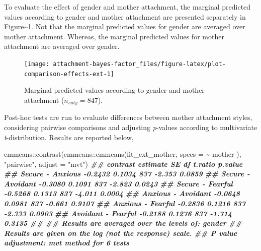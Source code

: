 \documentclass[
]{book}
\newenvironment{Shaded}{\begin{snugshade}}{\end{snugshade}}
\newcommand{\AttributeTok}[1]{\textcolor[rgb]{0.77,0.63,0.00}{#1}}
\newcommand{\DocumentationTok}[1]{\textcolor[rgb]{0.56,0.35,0.01}{\textbf{\textit{#1}}}}
\newcommand{\FunctionTok}[1]{\textcolor[rgb]{0.00,0.00,0.00}{#1}}
\newcommand{\NormalTok}[1]{#1}
\newcommand{\SpecialCharTok}[1]{\textcolor[rgb]{0.00,0.00,0.00}{#1}}
\newcommand{\StringTok}[1]{\textcolor[rgb]{0.31,0.60,0.02}{#1}}
\begin{document}
To evaluate the effect of gender and mother attachment, the marginal predicted values according to gender and mother attachment are presented separately in Figure\textasciitilde\ref{fig:plot-comparison-effects-ext}. Not that the marginal predicted values for gender are averaged over mother attachment. Whereas, the marginal predicted values for mother attachment are averaged over gender.

\begin{figure}

{\centering \texttt{[image: attachment-bayes-factor\_files/figure-latex/plot-comparison-effects-ext-1]} 

}

\caption{Marginal predicted values according to gender and mother attachment ($n_{subj} = 847$).}\label{fig:plot-comparison-effects-ext}
\end{figure}

Post-hoc tests are run to evaluate differences between mother attachment styles, considering pairwise comparisons and adjusting \emph{p}-values according to multivariate \emph{t}-distribution. Results are reported below,

\begin{Shaded}
\begin{Highlighting}[]
\NormalTok{emmeans}\SpecialCharTok{::}\FunctionTok{contrast}\NormalTok{(emmeans}\SpecialCharTok{::}\FunctionTok{emmeans}\NormalTok{(fit\_ext\_mother, }\AttributeTok{specs =} \SpecialCharTok{\textasciitilde{}}\NormalTok{ mother ),}
                  \StringTok{"pairwise"}\NormalTok{, }\AttributeTok{adjust =} \StringTok{"mvt"}\NormalTok{)}
\DocumentationTok{\#\#  contrast           estimate     SE  df t.ratio p.value}
\DocumentationTok{\#\#  Secure {-} Anxious    {-}0.2432 0.1034 837  {-}2.353  0.0859}
\DocumentationTok{\#\#  Secure {-} Avoidant   {-}0.3080 0.1091 837  {-}2.823  0.0243}
\DocumentationTok{\#\#  Secure {-} Fearful    {-}0.5268 0.1313 837  {-}4.011  0.0004}
\DocumentationTok{\#\#  Anxious {-} Avoidant  {-}0.0648 0.0981 837  {-}0.661  0.9107}
\DocumentationTok{\#\#  Anxious {-} Fearful   {-}0.2836 0.1216 837  {-}2.333  0.0903}
\DocumentationTok{\#\#  Avoidant {-} Fearful  {-}0.2188 0.1276 837  {-}1.714  0.3135}
\DocumentationTok{\#\# }
\DocumentationTok{\#\# Results are averaged over the levels of: gender }
\DocumentationTok{\#\# Results are given on the log (not the response) scale. }
\DocumentationTok{\#\# P value adjustment: mvt method for 6 tests}
\end{Highlighting}
\end{Shaded}
\end{document}
